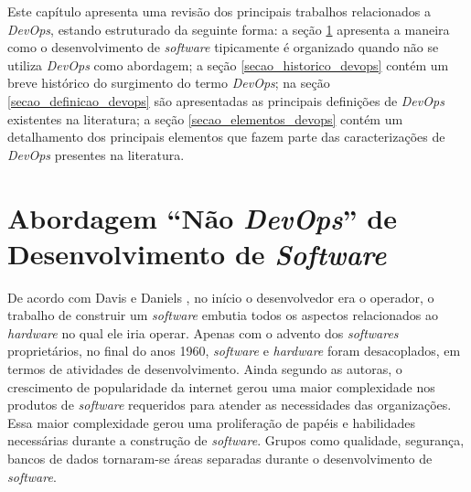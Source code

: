 \newcommand{\texCommand}[1]{\texttt{\textbackslash{#1}}}%

\newcommand{\exemplo}[1]{%
\vspace{\baselineskip}%
\noindent\fbox{\begin{minipage}{\textwidth}#1\end{minipage}}%
\\\vspace{\baselineskip}}%

\newcommand{\exemploVerbatim}[1]{%
\vspace{\baselineskip}%
\noindent\fbox{\begin{minipage}{\textwidth}%
#1\end{minipage}}%
\\\vspace{\baselineskip}}%

Este capítulo apresenta uma revisão dos principais trabalhos relacionados a
\textit{DevOps}, estando estruturado da seguinte forma: a seção \ref{secao_abordagem_nao_devops}
apresenta a maneira como o desenvolvimento de \textit{software} tipicamente é
organizado quando não se utiliza \textit{DevOps} como abordagem; a seção \ref{secao_historico_devops}
contém um breve histórico do surgimento do termo \textit{DevOps}; na seção
\ref{secao_definicao_devops} são apresentadas as principais definições de
\textit{DevOps} existentes na literatura; a seção \ref{secao_elementos_devops}
contém um detalhamento dos principais elementos que fazem parte das caracterizações
de \textit{DevOps} presentes na literatura.

\section{Abordagem ``Não \textit{DevOps}'' de Desenvolvimento de \textit{Software}}
\label{secao_abordagem_nao_devops}

De acordo com Davis e Daniels \cite{effective_devops}, no início o desenvolvedor
era o operador, o trabalho de construir um \textit{software} embutia todos
os aspectos relacionados ao \textit{hardware} no qual ele iria operar. Apenas
com o advento dos \textit{softwares} proprietários, no final do anos 1960,
\textit{software} e \textit{hardware} foram desacoplados, em termos de atividades
de desenvolvimento. Ainda segundo as autoras, o crescimento de popularidade da
internet gerou uma maior complexidade nos produtos de \textit{software}
requeridos para atender as necessidades das organizações. Essa maior
complexidade gerou uma proliferação de papéis e habilidades necessárias durante
a construção de \textit{software}. Grupos como qualidade, segurança, bancos de
dados tornaram-se áreas separadas durante o desenvolvimento de \textit{software}.

